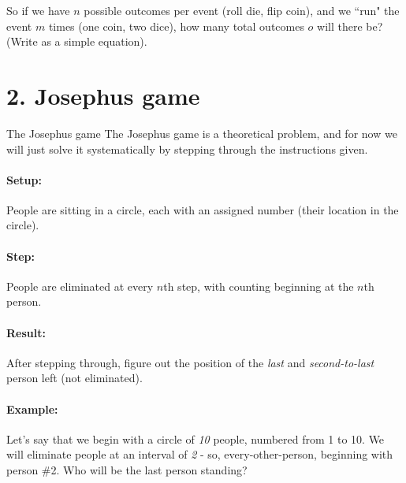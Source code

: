 \documentclass[a4paper,12pt]{book}
\newcounter{question}
\begin{document}
        \begin{questionNOGRADE}{\thequestion}
            So if we have $n$ possible outcomes per event (roll die, flip coin),
            and we ``run" the event $m$ times (one coin, two dice),
            how many total outcomes $ o $ will there be? (Write as a simple equation).
        \end{questionNOGRADE}

    \newpage
    \section*{2. Josephus game}

        \begin{intro}{The Josephus game}
            The Josephus game is a theoretical problem, and for now we
            will just solve it systematically by stepping through the
            instructions given.

            \paragraph{Setup:} People are sitting in a circle, each with
            an assigned number (their location in the circle).

            \paragraph{Step:} People are eliminated at every $n$th step,
            with counting beginning at the $n$th person.

            \paragraph{Result:} After stepping through, figure out the
            position of the \textit{last} and \textit{second-to-last}
            person left (not eliminated).

            \paragraph{Example:} Let's say that we begin with a circle of
            \textit{10} people, numbered from 1 to 10. We will eliminate
            people at an interval of \textit{2} - so, every-other-person,
            beginning with person \#2. Who will be the last person standing?


\end{intro}
\end{document}
